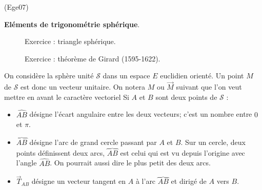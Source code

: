 \begin{tiny}(Ege07)\end{tiny}
\textbf{El{\'e}ments de trigonom{\'e}trie sph{\'e}rique}.\\
\begin{figure}[ht]
	\centering
	
	\caption{Exercice  : triangle sphérique.}
	\label{fig:Ege07_1}
\end{figure}
\begin{figure}[ht]
	\centering
	
	\caption{Exercice  : théorème de Girard (1595-1622).}
	\label{fig:Ege07_2}
\end{figure}
On consid{\`e}re la sph{\`e}re unit{\'e} $\mathcal{S}$ dans un espace $E$ euclidien orient{\'e}. Un point $M$ de $\mathcal{S}$ est donc un vecteur unitaire. On notera $M$ ou $\overrightarrow M$ suivant que l'on veut mettre en avant le caractère vectoriel\newline
 Si $A$ et $B$ sont deux points de $\mathcal{S}$ :
\begin{itemize}
\item  $\widehat{AB}$ d{\'e}signe l'{\'e}cart angulaire entre les deux vecteurs; c'est un nombre entre $0$ et $\pi $.

\item  $\overbrace{AB}$ d{\'e}signe l'arc de grand cercle passant par $A$ et $B.$ Sur un cercle, deux points d{\'e}finissent deux arcs, $\overbrace{AB}$ est celui qui est vu depuis l'origine avec l'angle $\widehat{AB}$. On pourrait aussi dire le plus petit des deux arcs.

\item  $\overrightarrow{T}_{AB}$ d{\'e}signe un vecteur tangent en $A$ {\`a} l'arc $\overbrace{AB}$ et dirigé de $A$ vers $B$.
\end{itemize}

